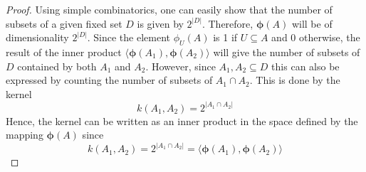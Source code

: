 \begin{proof}
    Using simple combinatorics, one can easily show that the number
    of subsets of a given fixed set $D$ is given by $2^{|D|}$.
    Therefore, $\bm{\phi}(A)$ will be of dimensionality $2^{|D|}$. Since
    the element $\phi_U(A)$ is 1 if $U \subseteq A$ and 0 otherwise,
    the result of the inner product $\langle \bm{\phi}(A_1), \bm{\phi}(A_2) \rangle$
    will give the number of subsets of $D$ contained by both $A_1$ and $A_2$. 
    However, since $A_1, A_2 \subseteq D$ this can also be expressed by counting
    the number of subsets of $A_1 \cap A_2$. This is done by the kernel
    \begin{equation}\label{eq:6.27}\tag{6.27}
        k(A_1, A_2) = 2^{|A_1 \cap A_2|}
    \end{equation}
    Hence, the kernel can be written as an inner product in the space defined
    by the mapping $\bm{\phi}(A)$ since
     \[
        k(A_1, A_2) = 2^{|A_1 \cap A_2|} = \langle \bm{\phi}(A_1), \bm{\phi}(A_2) \rangle
    \] 
\end{proof}
